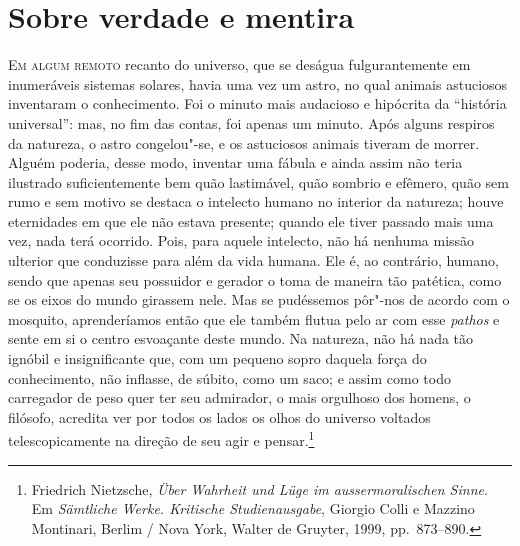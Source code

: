 \chapter*{Sobre verdade e mentira}


\sectionitem
\noindent\textsc{Em algum remoto} recanto do universo, que se deságua fulgurantemente em
inumeráveis sistemas solares, havia uma vez um astro, no qual animais
astuciosos inventaram o conhecimento. Foi o minuto mais audacioso e
hipócrita da “história universal”: mas, no fim das contas, foi apenas
um minuto. Após alguns respiros da natureza, o astro congelou"-se, e
os astuciosos animais tiveram de morrer. Alguém poderia, desse modo,
inventar uma fábula e ainda assim não teria ilustrado suficientemente
bem quão lastimável, quão sombrio e efêmero, quão sem rumo e sem motivo
se destaca o intelecto humano no interior da natureza; houve
eternidades em que ele não estava presente; quando ele tiver passado
mais uma vez, nada terá ocorrido. Pois, para aquele intelecto, não há
nenhuma missão ulterior que conduzisse para além da vida humana. Ele é,
ao contrário, humano, sendo que apenas seu possuidor e gerador o toma
de maneira tão patética, como se os eixos do mundo girassem nele. 
Mas se pudéssemos pôr"-nos de acordo com o mosquito, aprenderíamos então
que ele também flutua pelo ar com esse \textit{pathos} e sente em si o
centro esvoaçante deste mundo. Na natureza, não há nada tão ignóbil e
insignificante que, com um pequeno sopro daquela força do conhecimento,
não inflasse, de súbito, como um saco; e assim como todo carregador de
peso quer ter seu admirador, o mais orgulhoso dos homens, o filósofo,
acredita ver por todos os lados os olhos do universo voltados
telescopicamente na direção de seu agir e pensar.\footnote{ Friedrich Nietzsche,
\textit{Über Wahrheit und Lüge im aussermoralischen Sinne}.
Em \textit{Sämtliche Werke. Kritische Studienausgabe},
Giorgio Colli e Mazzino Montinari, Berlim / Nova
York, Walter de Gruyter, 1999, pp.~873--890.}

